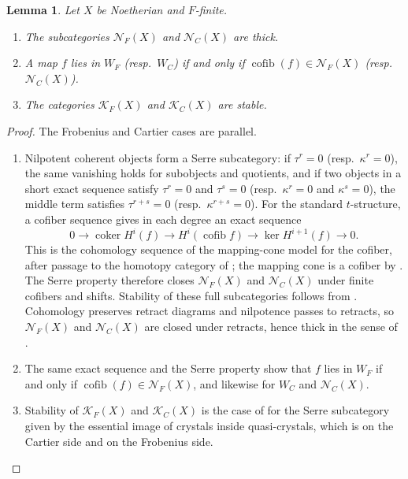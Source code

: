 \documentclass[11pt]{amsart}
\newcommand{\cN}{\mathcal{N}}
\newcommand{\cofib}{\operatorname{cofib}}
\newcommand{\KF}{\mathcal K_F}
\newcommand{\KC}{\mathcal K_C}
\theoremstyle{plain}
\newtheorem{lemma}[lemma]{Lemma}
\theoremstyle{definition}
\numberwithin{equation}{section}
\begin{document}
\begin{lemma}\label{lem:nil-stable}
Let $X$ be Noetherian and $F$-finite.
\begin{enumerate}
\item
The subcategories $\cN_F(X)$ and $\cN_C(X)$ are thick.
\item
A map $f$ lies in $W_F$ (resp.\ $W_C$) if and only if $\cofib(f)\in\cN_F(X)$ (resp.\ $\cN_C(X)$).
\item
The categories $\KF(X)$ and $\KC(X)$ are stable.
\end{enumerate}
\end{lemma}
\begin{proof}
The Frobenius and Cartier cases are parallel.
\begin{enumerate}
\item
Nilpotent coherent objects form a Serre subcategory: if $\tau^{r}=0$ (resp.\ $\kappa^{r}=0$), the same vanishing holds for subobjects and quotients, and if two objects in a short exact sequence satisfy $\tau^{r}=0$ and $\tau^{s}=0$ (resp.\ $\kappa^{r}=0$ and $\kappa^{s}=0$), the middle term satisfies $\tau^{r+s}=0$ (resp.\ $\kappa^{r+s}=0$).
For the standard $t$-structure, a cofiber sequence gives in each degree an exact sequence
\[
 0\longrightarrow\operatorname{coker}H^i(f)
 \longrightarrow H^i(\cofib f)
 \longrightarrow\ker H^{i+1}(f)\longrightarrow0.
\]
This is the cohomology sequence of the mapping-cone model for the cofiber, after passage to the homotopy category of ; the mapping cone is a cofiber by \cite[Remark 1.3.2.17]{HA}.
The Serre property therefore closes $\cN_F(X)$ and $\cN_C(X)$ under finite cofibers and shifts.
Stability of these full subcategories follows from \cite[Lemma 1.1.3.3]{HA}.
Cohomology preserves retract diagrams and nilpotence passes to retracts, so $\cN_F(X)$ and $\cN_C(X)$ are closed under retracts, hence thick in the sense of .
\item
The same exact sequence and the Serre property show that $f$ lies in $W_F$ if and only if $\cofib(f)\in\cN_F(X)$, and likewise for $W_C$ and $\cN_C(X)$.
\item
Stability of $\KF(X)$ and $\KC(X)$ is the case of  for the Serre subcategory given by the essential image of crystals inside quasi-crystals, which is \cite[Lemma 3.3.6]{Bau} on the Cartier side and \cite[Proposition 3.4.2(b)(c)]{BP} on the Frobenius side.
\end{enumerate}
\end{proof}
\end{document}
